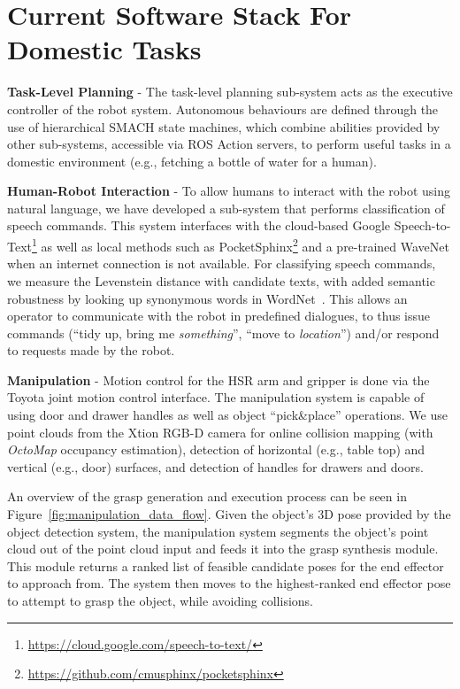 \documentclass[runningheads,a4paper]{llncs}
\begin{document}
\section{Current Software Stack For Domestic Tasks}\label{sec:current-software-stack-for-domestic-tasks}
\textbf{Task-Level Planning} - The task-level planning sub-system acts as the executive controller of the robot system. Autonomous behaviours are defined through the use of hierarchical SMACH state machines, which combine abilities provided by other sub-systems, accessible via ROS Action servers, to perform useful tasks in a domestic environment (e.g., fetching a bottle of water for a human).

\textbf{Human-Robot Interaction} - To allow humans to interact with the robot using natural language, we have developed a sub-system that performs classification of speech commands. 
This system interfaces with the cloud-based Google Speech-to-Text\footnote{\url{https://cloud.google.com/speech-to-text/}} as well as local methods such as PocketSphinx\footnote{\url{https://github.com/cmusphinx/pocketsphinx}} and a pre-trained WaveNet \cite{oord2016wavenet} when an internet connection is not available. 
For classifying speech commands, we measure the Levenstein distance with candidate texts, with added semantic robustness by looking up synonymous words in WordNet~\cite{miller1995wordnet}. 
This allows an operator to communicate with the robot in predefined dialogues, to thus issue commands (``tidy up, bring me \emph{something}'', ``move to \emph{location}'') and/or respond to requests made by the robot.

\textbf{Manipulation} - Motion control for the HSR arm and gripper is done via the Toyota joint motion control interface.
%
The manipulation system is capable of using door and drawer handles as well as object ``pick\&place'' operations.
%
We use point clouds from the Xtion RGB-D camera for online collision mapping (with \textit{OctoMap} occupancy estimation), detection of horizontal (e.g., table top) and vertical (e.g., door) surfaces, and detection of handles for drawers and doors.

An overview of the grasp generation and execution process can be seen in Figure~\ref{fig:manipulation_data_flow}.
%
Given the object's 3D pose provided by the object detection system, the manipulation system segments the object's point cloud out of the point cloud input and feeds it into the grasp synthesis module.
%
This module returns a ranked list of feasible candidate poses for the end effector to approach from.
%
The system then moves to the highest-ranked end effector pose to attempt to grasp the object, while avoiding collisions.
\end{document}
